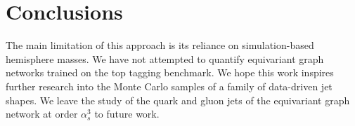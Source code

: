 \section{Conclusions}\label{sec:conclusions}

The main limitation of this approach is its reliance on simulation-based
hemisphere masses. We have not attempted to quantify equivariant graph
networks trained on the top tagging benchmark. We hope this work
inspires further research into the Monte Carlo samples of a family of
data-driven jet shapes. We leave the study of the quark and gluon jets
of the equivariant graph network at order $\alpha_s^3$ to future work.

